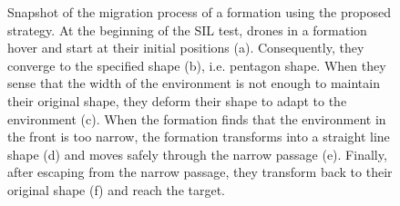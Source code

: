 \begin{figure}
\begin{subfigure}[b]{0.325\textwidth}
    \caption{}
    \end{subfigure}
    \caption{Snapshot of the migration process of a formation using the proposed strategy. At the beginning of the SIL test, drones in a formation hover and start at their initial positions (a). Consequently, they converge to the specified shape (b), i.e. pentagon shape. When they sense that the width of the environment is not enough to maintain their original shape, they deform their shape to adapt to the environment (c). When the formation finds that the environment in the front is too narrow, the formation transforms into a straight line shape (d) and moves safely through the narrow passage (e). Finally, after escaping from the narrow passage, they transform back to their original shape (f) and reach the target.}
    \label{fig:snap}
\end{figure}

